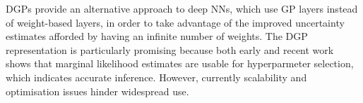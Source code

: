 DGPs \citep{Damianou2013} provide an alternative approach to deep NNs, which use GP layers instead of weight-based layers, in order to take advantage of the improved uncertainty estimates afforded by having an infinite number of weights. %
The DGP representation is particularly promising because both early and recent work \citep{Damianou2013,damianou2015thesis,Dutordoir2020convolutional} shows that marginal likelihood estimates are usable for hyperparmeter selection, which indicates accurate inference. However, currently scalability and optimisation issues hinder widespread use. 




